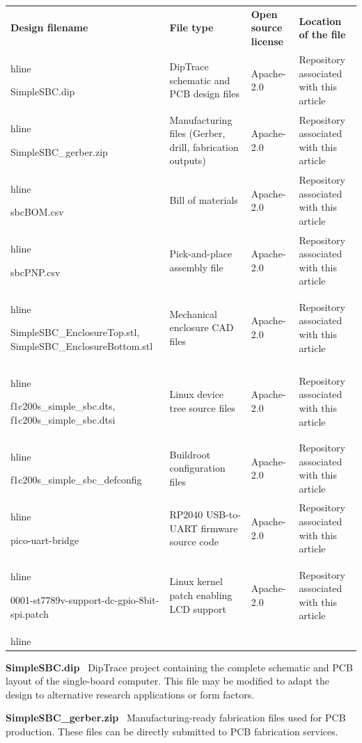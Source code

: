 \begin{tabu} to \linewidth {|X|X|X[1.5,1]|X[1.5,1]|}
\hline
\textbf{Design filename} & \textbf{File type} & \textbf{Open source license} & \textbf{Location of the file} \\hline

SimpleSBC.dip & DipTrace schematic and PCB design files & Apache-2.0 & Repository associated with this article \\hline

SimpleSBC_gerber.zip & Manufacturing files (Gerber, drill, fabrication outputs) & Apache-2.0 & Repository associated with this article \\hline

sbcBOM.csv & Bill of materials & Apache-2.0 & Repository associated with this article \\hline

sbcPNP.csv & Pick-and-place assembly file & Apache-2.0 & Repository associated with this article \\hline

SimpleSBC_EnclosureTop.stl, SimpleSBC_EnclosureBottom.stl & Mechanical enclosure CAD files & Apache-2.0 & Repository associated with this article \\hline

f1c200s_simple_sbc.dts, f1c200s_simple_sbc.dtsi & Linux device tree source files & Apache-2.0 & Repository associated with this article \\hline

f1c200s_simple_sbc_defconfig & Buildroot configuration files & Apache-2.0 & Repository associated with this article \\hline

pico-uart-bridge & RP2040 USB-to-UART firmware source code & Apache-2.0 & Repository associated with this article \\hline

0001-st7789v-support-dc-gpio-8bit-spi.patch & Linux kernel patch enabling LCD support & Apache-2.0 & Repository associated with this article \\hline

\end{tabu}

\vskip 0.3cm

\textbf{SimpleSBC.dip} \
DipTrace project containing the complete schematic and PCB layout of the single-board computer. This file may be modified to adapt the design to alternative research applications or form factors.

\textbf{SimpleSBC_gerber.zip} \
Manufacturing-ready fabrication files used for PCB production. These files can be directly submitted to PCB fabrication services.


